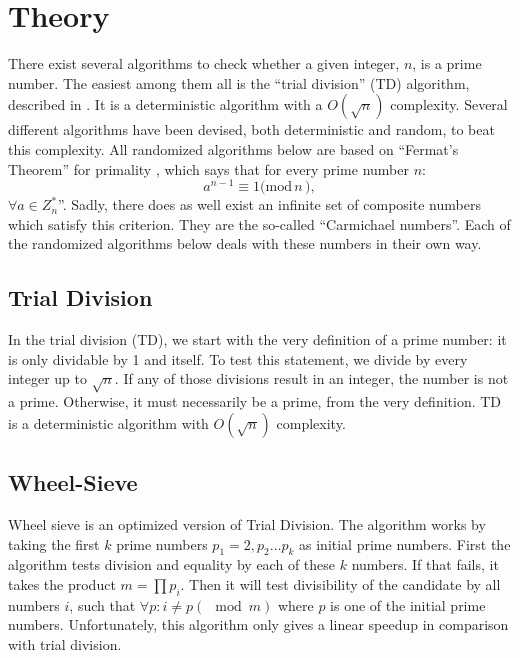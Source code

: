 \section{Theory}
There exist several algorithms to check whether a given integer, $n$, is a prime number.
The easiest among them all is the ``trial division'' (TD) algorithm, described in .
It is a deterministic algorithm with a $O(\sqrt{n})$ complexity.
Several different algorithms have been devised, both deterministic and random, to beat this complexity.
All randomized algorithms below are based on ``Fermat's Theorem'' for primality \cite{book:RA}, which says that for every prime number $n$: %
\begin{equation}
	a^{n-1} \equiv 1 \mathrm{(mod}\, n\, \mathrm{)},
\end{equation}
$\forall a \in Z_n^*$''.
Sadly, there does as well exist an infinite set of composite numbers which satisfy this criterion.
They are the so-called ``Carmichael numbers''.
Each of the randomized algorithms below deals with these numbers in their own way.

\subsection{Trial Division} \label{sec:TD_theory}
In the trial division (TD), we start with the very definition of a prime number: it is only dividable by 1 and itself.
To test this statement, we divide by every integer up to $\sqrt{n}$.
If any of those divisions result in an integer, the number is not a prime.
Otherwise, it must necessarily be a prime, from the very definition.
TD is a deterministic algorithm with $O(\sqrt{n})$ complexity.

\subsection{Wheel-Sieve} \label{sec:WS_theory}
Wheel sieve is an optimized version of Trial Division.
The algorithm works by taking the first $k$ prime numbers $p_1=2, p_2\ldots p_k$ as initial prime numbers.
First the algorithm tests division and equality by each of these $k$ numbers.
If that fails, it takes the product $m = \prod p_i$.
Then it will test divisibility of the candidate by all numbers $i$, such that $\forall p: i \neq p (\mod m)$ where $p$ is one of the initial prime numbers.
Unfortunately, this algorithm only gives a linear speedup in comparison with trial division.

